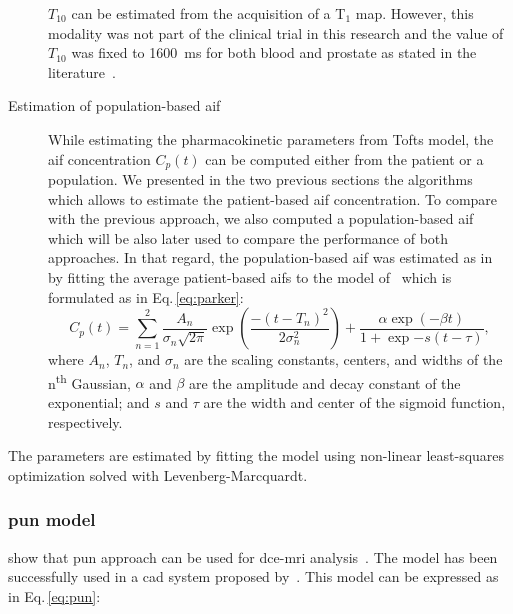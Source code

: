 \begin{description}
      $T_{10}$ can be estimated from the acquisition of a T$_1$ map.
      However, this modality was not part of the clinical trial in this research and the value of $T_{10}$ was fixed to \SI{1600}{\ms} for both blood and prostate as stated in the literature~\citep{fennessy2015quantitative,de2004mr,carr2011magnetic}.
      \item[Estimation of population-based \ac{aif}] While estimating the pharmacokinetic parameters from Tofts model, the \ac{aif} concentration $C_p(t)$ can be computed either from the patient or a population.
        We presented in the two previous sections the algorithms which allows to estimate the patient-based \ac{aif} concentration.
        To compare with the previous approach, we also computed a population-based \ac{aif} which will be also later used to compare the performance of both approaches.
        In that regard, the population-based \ac{aif} was estimated as in~\citep{meng2010comparison} by fitting the average patient-based \ac{aif}s to the model of~\cite{parker2006experimentally} which is formulated as in Eq.\,\eqref{eq:parker}:
        \begin{equation}
          C_p(t) = \sum_{n=1}^{2} \frac{A_n}{\sigma_n \sqrt{2 \pi}} \exp\left(\frac{- (t- T_n)^2}{2\sigma_{n}^{2}}\right) + \frac{\alpha \exp(-\beta t)}{1 + \exp{-s (t - \tau)}} ,
          \label{eq:parker}
        \end{equation}
        \noindent where $A_n$, $T_n$, and $\sigma_n$ are the scaling constants, centers, and widths of the n\textsuperscript{th} Gaussian, $\alpha$ and $\beta$ are the amplitude and decay constant of the exponential; and $s$ and $\tau$ are the width and center of the sigmoid function, respectively.
\end{description}

The parameters are estimated by fitting the model using non-linear least-squares optimization solved with Levenberg-Marcquardt.

\subsubsection{\acs*{pun} model}\label{sec:pun}

\citeauthor{gliozzi2011phenomenological} show that \ac{pun} approach can be used for \ac{dce}-\ac{mri} analysis~\citep{gliozzi2011phenomenological}.
The model has been successfully used in a \ac{cad} system proposed by~\cite{giannini2015fully}.
This model can be expressed as in Eq.\,\eqref{eq:pun}:

